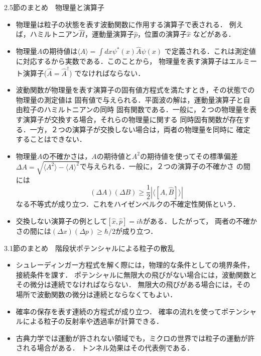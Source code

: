 \documentclass[11pt,a4paper]{jsarticle}
\newcommand{\average}[1]{\ensuremath{\langle#1\rangle} } %
\begin{document}
		\begin{itembox}[l]{2.5節のまとめ　物理量と演算子}
			\begin{itemize}
				\item 物理量は粒子の状態を表す波動関数に作用する演算子で表される．
							例えば，ハミルトニアン$\hat{H}$，運動量演算子$\hat{p}$，位置の演算子$\hat{x}$
							などがある．
				\item 物理量$A$の期待値は$\average{A} = \int dx\psi^*(x) \hat{A}\psi(x)$
							で定義される．これは測定値に対応するから実数である．このことから，
							物理量を表す演算子はエルミート演算子($\hat{A} = \hat{A}^{\dagger}$)
							でなければならない．
				\item 波動関数が物理量を表す演算子の固有値方程式を満たすとき，その状態での物理量の測定値は
							固有値で与えられる．平面波の解は，運動量演算子と自由粒子のハミルトニアンの同時
							固有関数である．一般に，２つの物理量を表す演算子が交換する場合，それらの物理量に関する
							同時固有関数が存在する．一方，２つの演算子が交換しない場合は，両者の物理量を同時に
							確定することはできない．
				\item 物理量$A$の不確かさは，$A$の期待値と$A^2$の期待値を使ってその標準偏差$\Delta A =
							\sqrt{\average{A^2} - \average{A}^2}$で与えられる．一般に，２つの演算子の不確かさ
							の間には$$(\Delta A)(\Delta B) \geq \frac{1}{2}|\average{[\hat{A},\hat{B}]}|$$なる不等式が成り立つ．これをハイゼンベルクの不確定性関係という．
				\item 交換しない演算子の例として$[\hat{x},\hat{p}] = i\hbar$がある．したがって，
							両者の不確かさの間には$(\Delta x)(\Delta p) \geq \hbar/2$が成り立つ．
			\end{itemize}
			\end{itembox}

		\begin{itembox}[l]{3.1節のまとめ　階段状ポテンシャルによる粒子の散乱}
			\begin{itemize}
				\item シュレーディンガー方程式を解く際には，物理的な条件としての境界条件，接続条件を課す．
							ポテンシャルに無限大の飛びがない場合には，波動関数とその微分は連続でなければならない．
							無限大の飛びがある場合には，その場所で波動関数の微分は連続とならなくてもよい．
				\item 確率の保存を表す連続の方程式が成り立つ．
							確率の流れを使ってポテンシャルによる粒子の反射率や透過率が計算できる．
				\item 古典力学では運動が許されない領域でも，ミクロの世界では粒子の運動が許される場合がある．
							トンネル効果はその代表例である．
			\end{itemize}
			\end{itembox}
\end{document}
